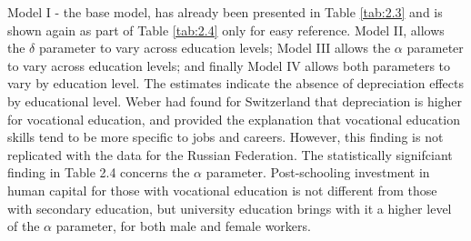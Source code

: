 \documentclass[alpha-refs]{wiley-article-02b}
\begin{document}
\vspace{3pt}

Model I - the base model, has already been presented in Table \ref{tab:2.3} and is shown again as part of Table \ref{tab:2.4} only for easy reference. Model II, allows the $\delta$ parameter to vary across education levels; Model III allows the $\alpha$ parameter to vary across education levels; and finally Model IV allows both parameters to vary by education level. The estimates indicate the absence of depreciation effects by educational level. Weber had found for Switzerland  that depreciation is higher for vocational education, and provided the explanation that vocational education skills tend to be more specific to jobs and careers. However, this finding is not replicated with the data for the Russian Federation. The statistically signifciant finding in Table 2.4 concerns the $\alpha$ parameter. Post-schooling investment in human capital for those with vocational education is not different from those with secondary education, but university education brings with it a higher level of the $\alpha$ parameter, for both male and female workers. 

\end{document}
